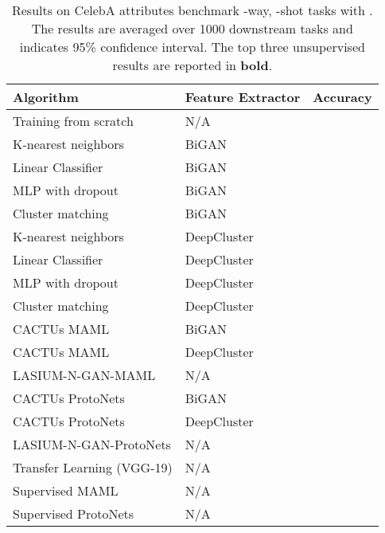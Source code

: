 \documentclass{article}
\begin{document}
 










\begin{table}[]
    \caption{Results on CelebA attributes benchmark -way, -shot tasks with . The results are averaged over 1000 downstream tasks and  indicates 95\% confidence interval. The top three unsupervised results are reported in {\bf bold}.}
    \label{tab:celeba-annotation}
    \centering
    {\footnotesize
        \begin{tabular}{lll}
            \toprule
            Algorithm & Feature Extractor & Accuracy \\
            \midrule
            Training from scratch & N/A & \\
            K-nearest neighbors & BiGAN & \\
            Linear Classifier & BiGAN &  \\
            MLP with dropout & BiGAN &  \\
            Cluster matching & BiGAN & \\
            K-nearest neighbors & DeepCluster & \\
            Linear Classifier & DeepCluster & \\
            MLP with dropout & DeepCluster & \\
            Cluster matching & DeepCluster & \\
            \midrule
            CACTUs MAML & BiGAN &  \\
            CACTUs MAML & DeepCluster &  \\
            LASIUM-N-GAN-MAML & N/A &  \\
            \midrule
            CACTUs ProtoNets & BiGAN &  \\
            CACTUs ProtoNets & DeepCluster &  \\
            LASIUM-N-GAN-ProtoNets & N/A &  \\
            \midrule
            Transfer Learning (VGG-19) & N/A &  \\
            Supervised MAML & N/A & \\
            Supervised ProtoNets & N/A & \\
            
            \bottomrule
        \end{tabular}
    }
\end{table}
\end{document}
